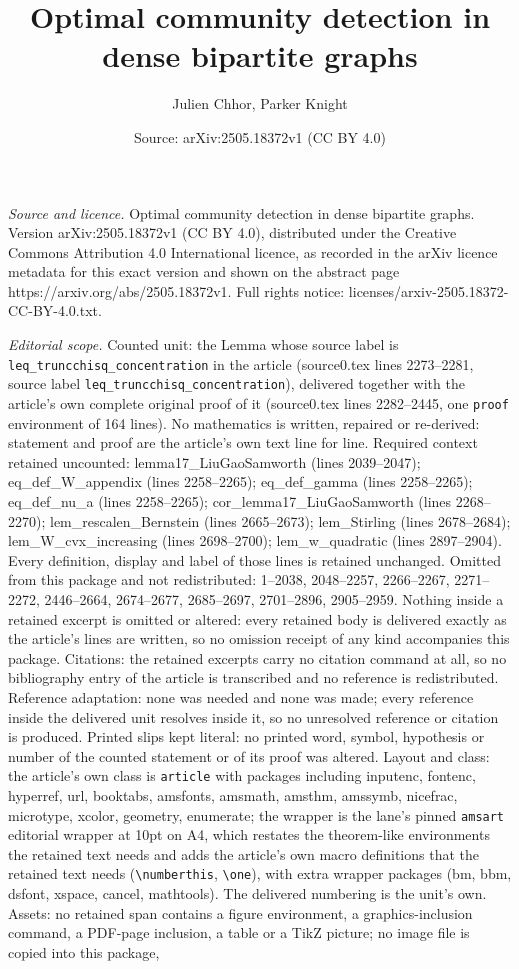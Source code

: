 \documentclass[10pt,a4paper]{amsart}
\title[Optimal community detection in dense bipartite graphs]{Optimal community detection in dense bipartite graphs}
\author{Julien Chhor, Parker Knight}
\date{Source: arXiv:2505.18372v1 (CC BY 4.0)}
\begin{document}
\maketitle

\noindent\emph{Source and licence.} Optimal community detection in dense bipartite graphs. Version arXiv:2505.18372v1 (CC BY 4.0), distributed under the Creative Commons Attribution 4.0 International licence, as recorded in the arXiv licence metadata for this exact version and shown on the abstract page https://arxiv.org/abs/2505.18372v1. Full rights notice: licenses/arxiv-2505.18372-CC-BY-4.0.txt.\par\smallskip

\noindent\textit{Editorial scope.} Counted unit: the Lemma whose source label is \texttt{leq\_truncchisq\_concentration} in the article (source0.tex lines 2273--2281, source label \texttt{leq\_truncchisq\_concentration}), delivered together with the article's own complete original proof of it (source0.tex lines 2282--2445, one \texttt{proof} environment of 164 lines). No mathematics is written, repaired or re-derived: statement and proof are the article's own text line for line. Required context retained uncounted: lemma17\_LiuGaoSamworth (lines 2039--2047); eq\_def\_W\_appendix (lines 2258--2265); eq\_def\_gamma (lines 2258--2265); eq\_def\_nu\_a (lines 2258--2265); cor\_lemma17\_LiuGaoSamworth (lines 2268--2270); lem\_rescalen\_Bernstein (lines 2665--2673); lem\_Stirling (lines 2678--2684); lem\_W\_cvx\_increasing (lines 2698--2700); lem\_w\_quadratic (lines 2897--2904). Every definition, display and label of those lines is retained unchanged. Omitted from this package and not redistributed: 1--2038, 2048--2257, 2266--2267, 2271--2272, 2446--2664, 2674--2677, 2685--2697, 2701--2896, 2905--2959. Nothing inside a retained excerpt is omitted or altered: every retained body is delivered exactly as the article's lines are written, so no omission receipt of any kind accompanies this package. Citations: the retained excerpts carry no citation command at all, so no bibliography entry of the article is transcribed and no reference is redistributed. Reference adaptation: none was needed and none was made; every reference inside the delivered unit resolves inside it, so no unresolved reference or citation is produced. Printed slips kept literal: no printed word, symbol, hypothesis or number of the counted statement or of its proof was altered. Layout and class: the article's own class is \texttt{article} with packages including inputenc, fontenc, hyperref, url, booktabs, amsfonts, amsmath, amsthm, amssymb, nicefrac, microtype, xcolor, geometry, enumerate; the wrapper is the lane's pinned \texttt{amsart} editorial wrapper at 10pt on A4, which restates the theorem-like environments the retained text needs and adds the article's own macro definitions that the retained text needs (\texttt{\textbackslash numberthis}, \texttt{\textbackslash one}), with extra wrapper packages (bm, bbm, dsfont, xspace, cancel, mathtools). The delivered numbering is the unit's own. Assets: no retained span contains a figure environment, a graphics-inclusion command, a PDF-page inclusion, a table or a TikZ picture; no image file is copied into this package, 
\end{document}
